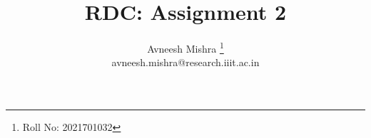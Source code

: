 

\title{RDC: Assignment 2}
\author{
    Avneesh Mishra 
    \thanks{Roll No: 2021701032} \\
    avneesh.mishra@research.iiit.ac.in
}


    \maketitle
    \tableofcontents
    \lstlistoflistings
    \listoffigures
    \pagebreak
    
    \pagebreak
    
    \pagebreak
    
    \pagebreak
    
    \pagebreak
    \pagebreak
    \appendix
    

